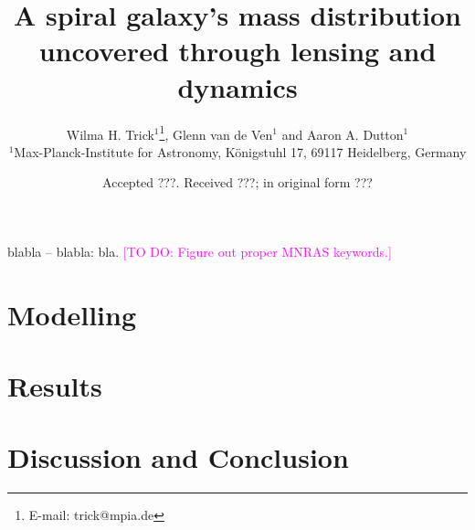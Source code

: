 \documentclass[useAMS,usenatbib]{mnras}
\title[A spiral galaxy's mass distribution uncovered]{A spiral galaxy's mass distribution uncovered through lensing and dynamics}
\author[W. H. Trick, G. van de Ven and A. A. Dutton]{Wilma H. Trick$^{1}$\thanks{E-mail:
trick@mpia.de}, Glenn van de Ven$^{1}$ and Aaron A. Dutton$^{1}$\\
$^{1}$Max-Planck-Institute for Astronomy, K\"{o}nigstuhl 17, 69117 Heidelberg, Germany}
\newcommand{\Wilma}[1]{\textcolor{Magenta}{#1}}
\begin{document}
\date{Accepted ???. Received ???; in original form ???}

\pagerange{\pageref{firstpage}--\pageref{lastpage}} 

\maketitle

\label{firstpage}

\begin{abstract}

\end{abstract}

\begin{keywords}
blabla -- blabla: bla. \Wilma{[TO DO: Figure out proper MNRAS keywords.]}
\end{keywords}



\section{Modelling} \label{sec:Modelling}






\section{Results} \label{sec:Results}





\section{Discussion and Conclusion} \label{sec:Discussion}







\label{lastpage}
\end{document}
